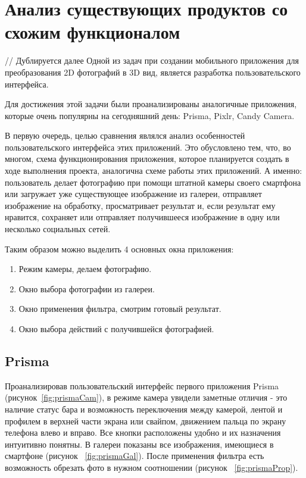 \section{Анализ существующих продуктов со схожим функционалом} // Дублируется далее
Одной из задач при создании мобильного приложения для преобразования 2D фотографий в 3D вид, является разработка пользовательского интерфейса.

Для достижения этой задачи были проанализированы аналогичные приложения, которые очень популярны на сегодняшний день: Prisma, Pixlr, Candy Camera.

В первую очередь, целью сравнения являлся анализ особенностей пользовательского интерфейса этих приложений. Это обусловлено тем, что, во многом, схема функционирования приложения, которое планируется создать в ходе выполнения проекта, аналогична схеме работы этих приложений. А именно: пользователь делает фотографию при помощи штатной камеры своего смартфона или загружает уже существующее изображение из галереи, отправляет изображение на обработку, просматривает результат и, если результат ему нравится, сохраняет или отправляет получившееся изображение в одну или несколько социальных сетей.

Таким образом можно выделить 4 основных окна приложения:
\begin{enumerate}
	\item Режим камеры, делаем фотографию.
	\item Окно выбора фотографии из галереи.
	\item Окно применения фильтра, смотрим готовый результат.
	\item Окно выбора действий с получившейся фотографией.
\end{enumerate}

\subsection{Prisma}
Проанализировав пользовательский интерфейс первого приложения Prisma (рисунок~\ref{fig:prismaCam}), в режиме камера увидели заметные отличия - это наличие статус бара и возможность переключения между камерой, лентой и профилем в верхней части экрана или свайпом, движением пальца по экрану телефона влево и вправо. Все кнопки расположены удобно и их назначения интуитивно понятны. В галереи показаны все изображения, имеющиеся в смартфоне (рисунок ~\ref{fig:prismaGal}). После применения фильтра есть возможность обрезать фото в нужном соотношении (рисунок ~\ref{fig:prismaProp}).

